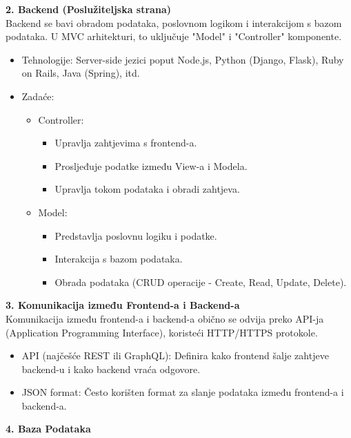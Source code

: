  \textbf{2. Backend (Poslužiteljska strana)}\\

Backend se bavi obradom podataka, poslovnom logikom i interakcijom s bazom podataka. U MVC arhitekturi, to uključuje "Model" i "Controller" komponente.
\begin{itemize}
		  \item {Tehnologije: Server-side jezici poput Node.js, Python (Django, Flask), Ruby on Rails, Java (Spring), itd.}
		  \item { Zadaće:
            \begin{itemize}
		  \item { Controller:
                    \begin{itemize}
		  \item {Upravlja zahtjevima s frontend-a.}
		  \item {Prosljeđuje podatke između View-a i Modela.}	
            \item {Upravlja tokom podataka i obradi zahtjeva.}
	   \end{itemize}}
        \item { Model:
                    \begin{itemize}
		  \item {Predstavlja poslovnu logiku i podatke.}
		  \item {Interakcija s bazom podataka.}	
            \item {Obrada podataka (CRUD operacije - Create, Read, Update, Delete).}
	   \end{itemize}}
	   \end{itemize}}	
	   \end{itemize}


 \textbf{3. Komunikacija između Frontend-a i Backend-a}\\

Komunikacija između frontend-a i backend-a obično se odvija preko API-ja (Application Programming Interface), koristeći HTTP/HTTPS protokole.
\begin{itemize}
		  \item {API (najčešće REST ili GraphQL): Definira kako frontend šalje zahtjeve backend-u i kako backend vraća odgovore.}
		  \item {JSON format: Često korišten format za slanje podataka između frontend-a i backend-a.}	
	   \end{itemize}


 \textbf{4. Baza Podataka}\\

